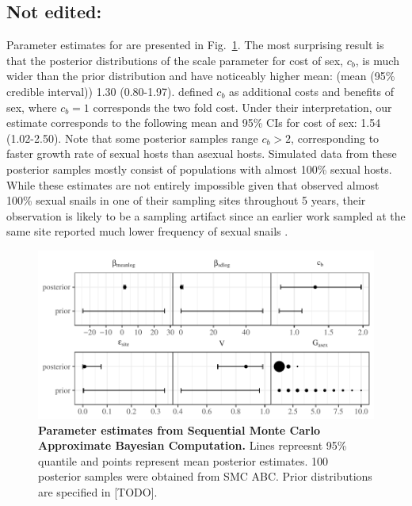 \documentclass{article}\usepackage[]{graphicx}\usepackage[]{color}
\newcommand{\fref}[1]{Fig.~\ref{fig:#1}}
\begin{document}
\subsection*{Not edited:}

Parameter estimates for \cite{vergara2014infection} are presented in \fref{smcparam}.
The most surprising result is that the posterior distributions of the scale parameter for cost of sex, $c_b$, is much wider than the prior distribution and have noticeably higher mean: (mean (95\% credible interval)) 1.30 (0.80-1.97).
\cite{ashby2015diversity} defined $c_b$ as additional costs and benefits of sex, where $c_b=1$ corresponds the two fold cost.
Under their interpretation, our estimate corresponds to the following mean and 95\% CIs for cost of sex: 1.54 (1.02-2.50).
Note that some posterior samples range $c_b > 2$, corresponding to faster growth rate of sexual hosts than asexual hosts.
Simulated data from these posterior samples mostly consist of populations with almost 100\% sexual hosts.
While these estimates are not entirely impossible given that \cite{vergara2014infection} observed almost 100\% sexual snails in one of their sampling sites throughout 5 years, their observation is likely to be a sampling artifact since an earlier work sampled at the same site reported much lower frequency of sexual snails \citep{vergara2013geographic}. %

\begin{figure}[!ht]
\includegraphics[width=\textwidth]{../fig/verg_post.pdf}
\caption{{\bf Parameter estimates from Sequential Monte Carlo Approximate Bayesian Computation.}
Lines repreesnt 95\% quantile and points represent mean posterior estimates. 100 posterior samples were obtained from SMC ABC. Prior distributions are specified in [TODO].
}
\label{fig:smcparam}
\end{figure}
\end{document}
